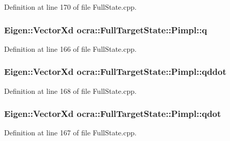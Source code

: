 Definition at line 170 of file Full\+State.\+cpp.

\subsubsection[{\texorpdfstring{q}{q}}]{\setlength{\rightskip}{0pt plus 5cm}Eigen\+::\+Vector\+Xd ocra\+::\+Full\+Target\+State\+::\+Pimpl\+::q}\hypertarget{structocra_1_1FullTargetState_1_1Pimpl_afb9abfe35480d2dea95ed9d54e8906df}{}\label{structocra_1_1FullTargetState_1_1Pimpl_afb9abfe35480d2dea95ed9d54e8906df}


Definition at line 166 of file Full\+State.\+cpp.

\subsubsection[{\texorpdfstring{qddot}{qddot}}]{\setlength{\rightskip}{0pt plus 5cm}Eigen\+::\+Vector\+Xd ocra\+::\+Full\+Target\+State\+::\+Pimpl\+::qddot}\hypertarget{structocra_1_1FullTargetState_1_1Pimpl_a6eb86dcb00ed58935f11c42f030645a3}{}\label{structocra_1_1FullTargetState_1_1Pimpl_a6eb86dcb00ed58935f11c42f030645a3}


Definition at line 168 of file Full\+State.\+cpp.

\subsubsection[{\texorpdfstring{qdot}{qdot}}]{\setlength{\rightskip}{0pt plus 5cm}Eigen\+::\+Vector\+Xd ocra\+::\+Full\+Target\+State\+::\+Pimpl\+::qdot}\hypertarget{structocra_1_1FullTargetState_1_1Pimpl_a2d1307a89fa37ddb50305785e7d91e68}{}\label{structocra_1_1FullTargetState_1_1Pimpl_a2d1307a89fa37ddb50305785e7d91e68}


Definition at line 167 of file Full\+State.\+cpp.

